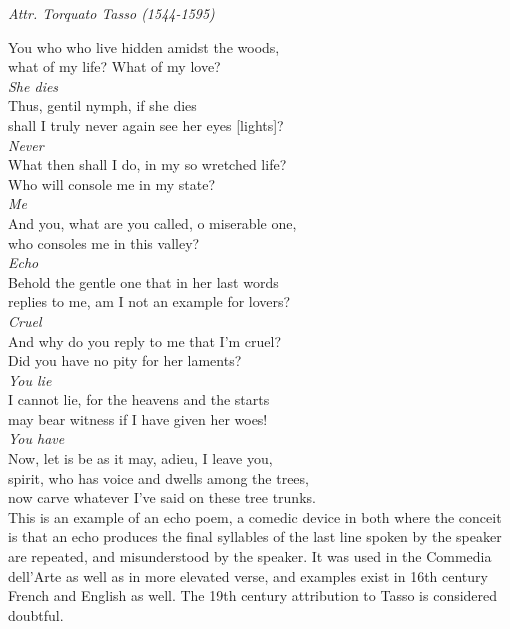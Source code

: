 \documentclass[12pt, twocolumn]{text-translation}
\begin{document}
{\raggedleft \textit{Attr. Torquato Tasso (1544-1595)}\par}
\poemasterisks
You who who live hidden amidst the woods, \\
what of my life? What of my love? \\
\hspace*{1cm}\textit{She dies} \\
Thus, gentil nymph, if she dies \\
shall I truly never again see her eyes [lights]? \\
\hspace*{1cm}\textit{Never} \\
What then shall I do, in my so wretched life? \\
Who will console me in my state? \\
\hspace*{1cm}\textit{Me} \\
And you, what are you called, o miserable one, \\
who consoles me in this valley? \\
\hspace*{1cm}\textit{Echo} \\
Behold the gentle one that in her last words \\
replies to me, am I not an example for lovers? \\
\hspace*{1cm}\textit{Cruel} \\
And why do you reply to me that I'm cruel? \\
Did you have no pity for her laments? \\
\hspace*{1cm}\textit{You lie} \\
I cannot lie, for the heavens and the starts \\
may bear witness if I have given her woes! \\
\hspace*{1cm}\textit{You have} \\
Now, let is be as it may, adieu, I leave you, \\
spirit, who has voice and dwells among the trees, \\
now carve whatever I've said on these tree trunks. \\


 This is an example of an echo poem,
a comedic device in both where the conceit is that an echo
produces the final syllables of the last line spoken by the
speaker are repeated, and misunderstood by the speaker. It was used
in the Commedia dell'Arte as well as in more elevated verse, and
examples exist in 16th century French and English as well. The
19th century attribution to Tasso is considered doubtful.
\end{document}
